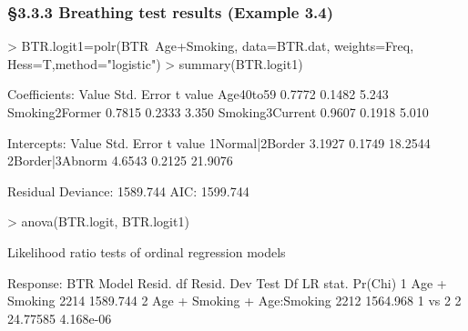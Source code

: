 \documentclass{beamer}
\begin{document}
\begin{frame}[fragile] \frametitle{\S3.3.3 Breathing test results  (Example 3.4)}
\begin{scriptsize}
\begin{Schunk}
\begin{Sinput}
> BTR.logit1=polr(BTR~Age+Smoking, data=BTR.dat, weights=Freq, Hess=T,method="logistic")
> summary(BTR.logit1)
\end{Sinput} 
\begin{Soutput}
Coefficients:
                 Value Std. Error t value
Age40to59       0.7772     0.1482   5.243
Smoking2Former  0.7815     0.2333   3.350
Smoking3Current 0.9607     0.1918   5.010

Intercepts:
                Value   Std. Error t value
1Normal|2Border  3.1927  0.1749    18.2544
2Border|3Abnorm  4.6543  0.2125    21.9076

Residual Deviance: 1589.744 
AIC: 1599.744 
\end{Soutput}
\begin{Sinput}
> anova(BTR.logit, BTR.logit1)
\end{Sinput} 
\begin{Soutput}
Likelihood ratio tests of ordinal regression models

Response: BTR
                        Model Resid. df Resid. Dev   Test    Df LR stat.   Pr(Chi)
1               Age + Smoking      2214   1589.744                                   
2 Age + Smoking + Age:Smoking      2212   1564.968 1 vs 2     2 24.77585 4.168e-06
\end{Soutput}
\end{Schunk}
\end{scriptsize}
\end{frame}
\end{document}
